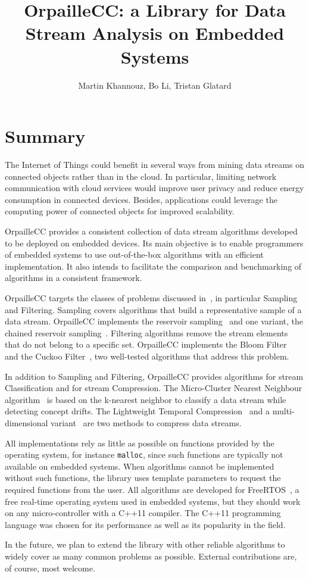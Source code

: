 \documentclass{article}
\title{OrpailleCC: a Library for Data Stream Analysis on Embedded Systems}
\author{Martin Khannouz, Bo Li, Tristan Glatard}
\begin{document}
\maketitle
\section{Summary}

The Internet of Things could benefit in several ways from mining data 
streams on connected objects rather than in the cloud. In particular, 
limiting network communication with cloud services would improve user 
privacy and reduce energy consumption in connected devices. Besides, 
applications could leverage the computing power of connected objects 
for improved scalability.

OrpailleCC provides a consistent collection of data stream algorithms 
developed to be deployed on embedded devices. Its main objective
is to enable programmers of embedded systems to use 
out-of-the-box algorithms with an efficient implementation. It also 
intends to facilitate the comparison and benchmarking of algorithms in a 
consistent framework.

OrpailleCC targets the classes of problems discussed in~\cite{kejariwal2015},
 in particular Sampling and 
Filtering. Sampling covers algorithms that 
build a representative sample of a
data stream. OrpailleCC implements the reservoir
sampling~\cite{reservoir_sampling} and one variant, the chained reservoir
sampling~\cite{chained_reservoir_sampling}. Filtering algorithms
remove the stream elements that do not belong to a specific set.
OrpailleCC implements the Bloom Filter~\cite{bloom} and the Cuckoo
Filter~\cite{cuckoo_filter}, two well-tested algorithms that address this
problem.

In addition to Sampling and Filtering, OrpailleCC
provides algorithms for stream Classification and for stream Compression. The 
Micro-Cluster Nearest Neighbour algorithm~\cite{mc-nn} is based on the 
k-nearest neighbor to classify a data stream while detecting concept 
drifts. The Lightweight Temporal Compression~\cite{ltc} and a 
multi-dimensional variant~\cite{ltcd} are two methods to compress data 
streams.

All implementations rely as little as possible on functions provided by the 
operating system, for instance \texttt{malloc}, since such functions are typically
not available on embedded systems. When algorithms cannot be
implemented without such functions, the library uses template parameters to 
request the required functions from the user.  All algorithms are 
developed for FreeRTOS~\cite{freertos}, a free real-time operating 
system used in embedded systems, but they should work on any 
micro-controller with a C++11 compiler. The C++11 programming language 
was chosen for its performance as well as its popularity in the 
field.

In the future, we plan to extend the library with other reliable 
algorithms to widely cover as many common problems as possible.
External contributions are, of course, most welcome.




\end{document}
